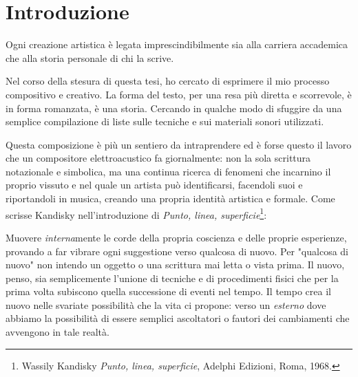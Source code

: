 
\chapter*{Introduzione}


Ogni creazione artistica è legata imprescindibilmente sia alla carriera accademica che alla storia personale di chi la scrive.

Nel corso della stesura di questa tesi, ho cercato di esprimere il mio processo compositivo e creativo. La forma del testo, per una resa più diretta e scorrevole, è in forma romanzata, è una storia. Cercando in qualche modo di sfuggire da una semplice compilazione di liste sulle tecniche e sui materiali sonori utilizzati.

Questa composizione è più un sentiero da intraprendere ed è forse questo il lavoro che un compositore elettroacustico fa giornalmente: non la sola scrittura notazionale e simbolica, ma una continua ricerca di fenomeni che incarnino il proprio vissuto e nel quale un artista può identificarsi, facendoli suoi e riportandoli in musica, creando una propria identità artistica e formale. Come scrisse Kandisky nell'introduzione di \textit{Punto, linea, superficie}\footnote{Wassily Kandisky \textit{Punto, linea, superficie}, Adelphi Edizioni, Roma, 1968.}: 


Muovere \textit{interna}mente le corde della propria coscienza e delle proprie esperienze, provando a far vibrare ogni suggestione verso qualcosa di nuovo. Per "qualcosa di nuovo" non intendo un oggetto o una scrittura mai letta o vista prima. Il nuovo, penso, sia semplicemente l'unione di tecniche e di procedimenti fisici che per la prima volta subiscono quella successione di eventi nel tempo. Il tempo crea il nuovo nelle svariate possibilità che la vita ci propone: verso un \textit{esterno} dove abbiamo la possibilità di essere semplici ascoltatori o fautori dei cambiamenti che avvengono in tale realtà. 
